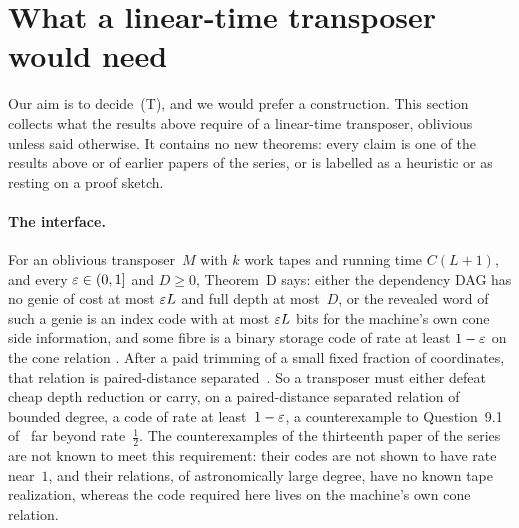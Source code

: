 \section{What a linear-time transposer would need}\label{sec:construction}

Our aim is to decide~(T), and we would prefer a construction. This section collects what the results above require of a
linear-time transposer, oblivious unless said otherwise. It contains no new theorems: every claim is one of the results above
or of earlier papers of the series, or is labelled as a heuristic or as resting on a proof sketch.

\paragraph{The interface.} For an oblivious transposer~$M$ with $k$ work tapes and running time $C(L+1)$, and every
$\varepsilon\in(0,1]$ and $D\ge0$, Theorem~D says: either the dependency DAG has no genie of cost at most $\varepsilon L$ and full depth at
most~$D$, or the revealed word of such a genie is an index code with at most $\varepsilon L$ bits for the machine's own cone side
information, and some fibre is a binary storage code of rate at least $1-\varepsilon$ on the cone relation
\cite[Theorem~4.10 and Remark~4.9(b)]{FourthPaper2026}. After a paid trimming of a small fixed fraction of coordinates, that
relation is paired-distance separated~\cite[Theorem~3.3 and Corollary~3.8]{DirectedRecovery2026}. So a transposer must either
defeat cheap depth reduction or carry, on a paired-distance separated relation of bounded degree, a code of rate at
least~$1-\varepsilon$, a counterexample to Question~9.1 of~\cite{DirectedRecovery2026} far beyond rate~$\frac12$. The
counterexamples of the thirteenth paper of the series~\cite[Theorem~A]{StorageCodes2026} are not known to meet this requirement: their
codes are not shown to have rate near~$1$, and their relations, of astronomically large degree, have no known tape
realization, whereas the code required here lives on the machine's own cone relation.

